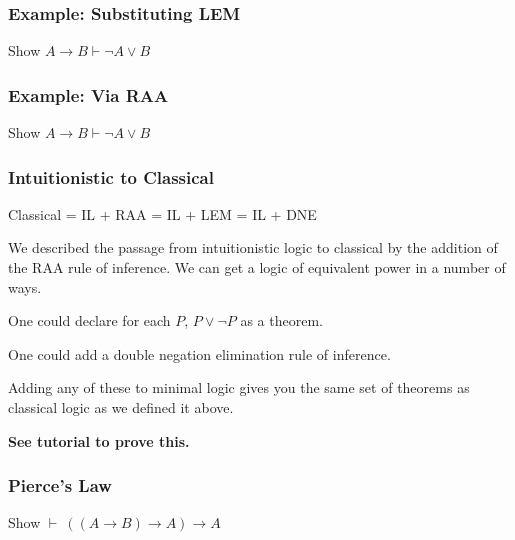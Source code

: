 \documentclass{beamer}
\begin{document}
\begin{frame}
	\frametitle{Example: Substituting LEM}
	
	Show $A \rightarrow B \vdash \lnot A \lor B$
	
	\vspace{7cm}
		
	
\end{frame}

\begin{frame}
	\frametitle{Example: Via RAA}
	
	Show $A \rightarrow B \vdash \lnot A \lor B$
	
	\vspace{7cm}
		
	
\end{frame}

\begin{frame}
  \frametitle{Intuitionistic to Classical}

  	\begin{center}
	Classical = IL + RAA = IL + LEM = IL + DNE
	\end{center}

	\vspace{0.3cm}

    We described the passage from intuitionistic logic to classical by the addition of the RAA rule of inference. We can get a logic of equivalent power in a number of ways. 

    \vspace{0.3cm}

    One could declare for each $P$,  $P \lor \lnot P$ as a theorem. 

    \vspace{0.3cm}

    One could add a double negation elimination rule of inference. 

    \vspace{0.3cm}

    Adding any of these to minimal logic gives you the same set of theorems as classical logic as we defined it above. 

	{\bf See tutorial to prove this.}

\end{frame}

\begin{frame}
	\frametitle{Pierce's Law}
	
	Show $\vdash \ ((A \to B) \to A) \to A$
	
	\vspace{7cm}
	

\end{frame}
\end{document}
